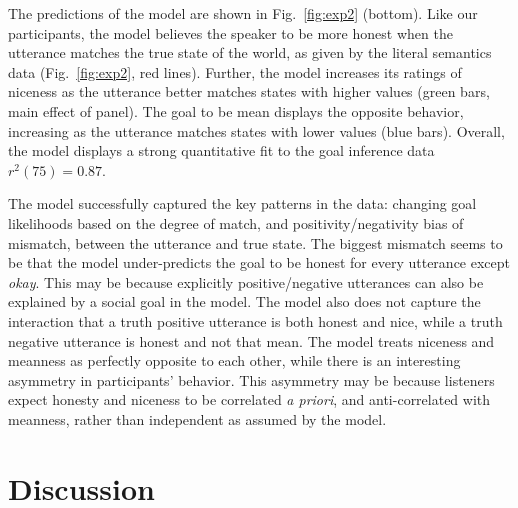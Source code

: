 \documentclass[10pt,letterpaper]{article}
\begin{document}


The predictions of the model are shown in Fig.~\ref{fig:exp2} (bottom).
Like our participants, the model believes the speaker to be more honest when the utterance matches the true state of the world, as given by the literal semantics data (Fig.~\ref{fig:exp2}, red lines).
Further, the model increases its ratings of niceness as the utterance better matches states with higher values (green bars, main effect of panel).
The goal to be mean displays the opposite behavior, increasing as the utterance matches states with lower values (blue bars).
Overall, the model displays a strong quantitative fit to the goal inference data $r^2(75) = 0.87$.

The model successfully captured the key patterns in the data:
changing goal likelihoods based on the degree of match, and positivity/negativity bias of mismatch, between the utterance and true state.
The biggest mismatch seems to be that the model under-predicts the goal to be honest for every utterance except \emph{okay}.
This may be because explicitly positive/negative utterances can also be explained by a social goal in the model.
The model also does not capture the interaction that a truth positive utterance is both honest and nice, while a truth negative utterance is honest and not that mean.
 The model treats niceness and meanness as perfectly opposite to each other, while there is an interesting asymmetry in participants' behavior. 
This asymmetry may be because listeners expect honesty and niceness to be correlated \emph{a priori}, and anti-correlated with meanness, rather than independent as assumed by the model.

\section{Discussion}
\end{document}
